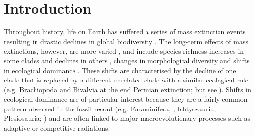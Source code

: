 \documentclass[10pt,letterpaper]{article}
\begin{document}

\linenumbers

\section*{Introduction}
Throughout history, life on Earth has suffered a series of mass extinction events resulting in drastic declines in global biodiversity \citep[e.g.][]{RaupPT,BentonPT,rennetime2013,Brusatte2015}.
The long-term effects of mass extinctions, however, are more varied \citep{Erwin1998344}, and include species richness increases in some clades \citep{friedmanexplosive2010} and declines in others \citep{Benton85}, changes in morphological diversity \citep{Ciampaglio2001,Ciampaglio2004,kornextinction2013} and shifts in ecological dominance \citep[e.g.][]{Brusatte12092008,toljagictriassic-jurassic2013,bensonfaunal2014}.
These shifts are characterised by the decline of one clade that is replaced by a different unrelated clade with a similar ecological role (e.g. Brachiopoda and Bivalvia at the end Permian extinction; \citealt{Liow2015} %
 but see \citealt{Payne22052014}). 
Shifts in ecological dominance are of particular interest because they are a fairly common pattern observed in the fossil record (e.g. Foraminifera; \citealt{Coxall01042006} %
; Ichtyosauria; \citealt{thorneresetting2011}; Plesiosauria; \citealt{bensonfaunal2014}) and are often linked to major macroevolutionary processes such as adaptive \citep{Losos2010} or competitive \citep{Brusatte12092008} radiations.
\end{document}
